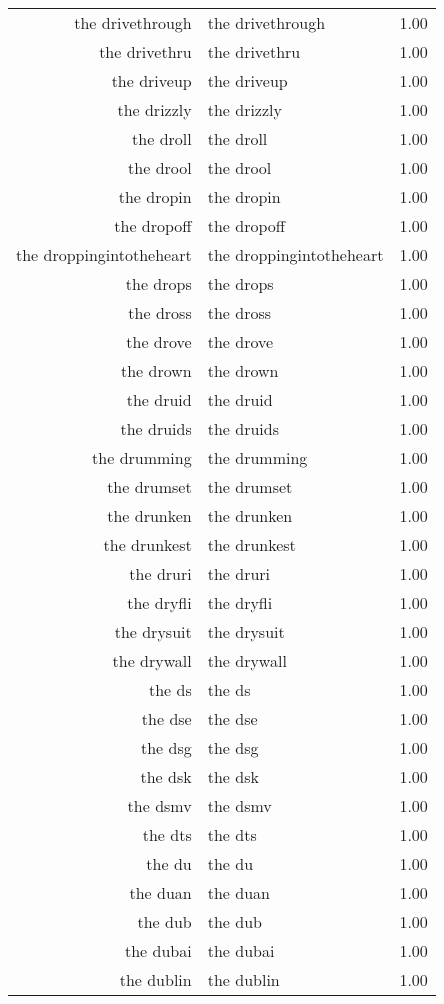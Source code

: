 \begin{table}[ht]
\begin{tabular}{rlr}
  the drivethrough & the drivethrough & 1.00 \\ 
  the drivethru & the drivethru & 1.00 \\ 
  the driveup & the driveup & 1.00 \\ 
  the drizzly & the drizzly & 1.00 \\ 
  the droll & the droll & 1.00 \\ 
  the drool & the drool & 1.00 \\ 
  the dropin & the dropin & 1.00 \\ 
  the dropoff & the dropoff & 1.00 \\ 
  the droppingintotheheart & the droppingintotheheart & 1.00 \\ 
  the drops & the drops & 1.00 \\ 
  the dross & the dross & 1.00 \\ 
  the drove & the drove & 1.00 \\ 
  the drown & the drown & 1.00 \\ 
  the druid & the druid & 1.00 \\ 
  the druids & the druids & 1.00 \\ 
  the drumming & the drumming & 1.00 \\ 
  the drumset & the drumset & 1.00 \\ 
  the drunken & the drunken & 1.00 \\ 
  the drunkest & the drunkest & 1.00 \\ 
  the druri & the druri & 1.00 \\ 
  the dryfli & the dryfli & 1.00 \\ 
  the drysuit & the drysuit & 1.00 \\ 
  the drywall & the drywall & 1.00 \\ 
  the ds & the ds & 1.00 \\ 
  the dse & the dse & 1.00 \\ 
  the dsg & the dsg & 1.00 \\ 
  the dsk & the dsk & 1.00 \\ 
  the dsmv & the dsmv & 1.00 \\ 
  the dts & the dts & 1.00 \\ 
  the du & the du & 1.00 \\ 
  the duan & the duan & 1.00 \\ 
  the dub & the dub & 1.00 \\ 
  the dubai & the dubai & 1.00 \\ 
  the dublin & the dublin & 1.00 \\ 

\end{tabular}
\end{table}
